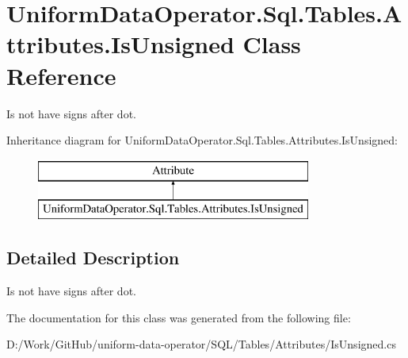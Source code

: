 \hypertarget{class_uniform_data_operator_1_1_sql_1_1_tables_1_1_attributes_1_1_is_unsigned}{}\section{Uniform\+Data\+Operator.\+Sql.\+Tables.\+Attributes.\+Is\+Unsigned Class Reference}
\label{class_uniform_data_operator_1_1_sql_1_1_tables_1_1_attributes_1_1_is_unsigned}


Is not have signs after dot.  


Inheritance diagram for Uniform\+Data\+Operator.\+Sql.\+Tables.\+Attributes.\+Is\+Unsigned\+:\begin{figure}[H]
\begin{center}
\leavevmode
\includegraphics[height=2.000000cm]{df/ddb/class_uniform_data_operator_1_1_sql_1_1_tables_1_1_attributes_1_1_is_unsigned}
\end{center}
\end{figure}


\subsection{Detailed Description}
Is not have signs after dot. 



The documentation for this class was generated from the following file\+:\begin{DoxyCompactItemize}
\item 
D\+:/\+Work/\+Git\+Hub/uniform-\/data-\/operator/\+S\+Q\+L/\+Tables/\+Attributes/Is\+Unsigned.\+cs\end{DoxyCompactItemize}
